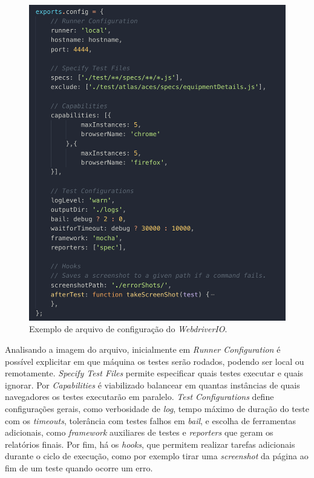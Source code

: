 \begin{figure}[H]
    \centering
    \includegraphics[width=13cm]{source/4-solucao/images/webdriverio.png}
    \caption{Exemplo de arquivo de configuração do \emph{WebdriverIO}.}
    \label{fig:webdriverio}
\end{figure}

Analisando a imagem do arquivo, inicialmente em \emph{Runner Configuration} é possível explicitar em que máquina os testes serão rodados, podendo ser local ou remotamente. \emph{Specify Test Files} permite especificar quais testes executar e quais ignorar. Por \emph{Capabilities} é viabilizado balancear em quantas instâncias de quais navegadores os testes executarão em paralelo. \emph{Test Configurations} define configurações gerais, como verbosidade de \emph{log}, tempo máximo de duração do teste com os \emph{timeouts}, tolerância com testes falhos em \emph{bail}, e escolha de ferramentas adicionais, como \emph{framework} auxiliares de testes e \emph{reporters} que geram os relatórios finais. Por fim, há os \emph{hooks}, que permitem realizar tarefas adicionais durante o ciclo de execução, como por exemplo tirar uma \emph{screenshot} da página ao fim de um teste quando ocorre um erro.

